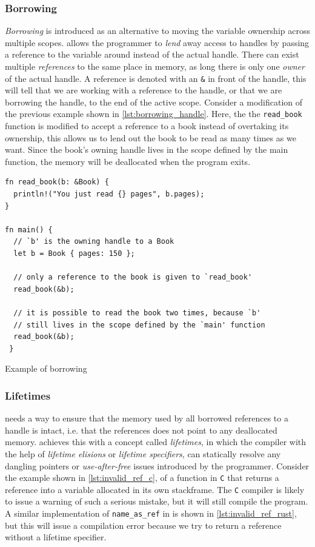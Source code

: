 \subsubsection{Borrowing}
\label{ssec:borrowing}

\emph{Borrowing} is introduced as an alternative to moving the variable ownership across multiple scopes.
\rust allows the programmer to \emph{lend} away access to handles by passing a reference to the variable around instead of the actual handle.
There can exist multiple \emph{references} to the same place in memory, as long there is only one \emph{owner} of the actual handle.
A reference is denoted with an \texttt{\&} in front of the handle, this will tell \rust that we are working with a reference to the handle, or that we are borrowing the handle, to the end of the active scope.
Consider a modification of the previous example shown in \autoref{lst:borrowing_handle}.
Here, the the \texttt{read\_book} function is modified to accept a reference to a book instead of overtaking its ownership, this allows us to lend out the book to be read as many times as we want.
Since the book's owning handle lives in the scope defined by the main function, the memory will be deallocated when the program exits.

\begin{listing}[tb]
\begin{verbatim}
fn read_book(b: &Book) {
  println!("You just read {} pages", b.pages);
}

fn main() {
  // `b' is the owning handle to a Book
  let b = Book { pages: 150 };

  // only a reference to the book is given to `read_book'
  read_book(&b);

  // it is possible to read the book two times, because `b'
  // still lives in the scope defined by the `main' function
  read_book(&b);
 }
\end{verbatim}
\caption{Example of borrowing}
\label{lst:borrowing_handle}
\end{listing}

\subsubsection{Lifetimes}
\label{ssec:lifetimes}

\rust needs a way to ensure that the memory used by all borrowed references to a handle is intact, i.e. that the references does not point to any deallocated memory.
\rust achieves this with a concept called \emph{lifetimes}, in which the compiler with the help of \emph{lifetime elisions} or \emph{lifetime specifiers}, can statically resolve any dangling pointers or \emph{use-after-free} issues introduced by the programmer.
Consider the example shown in \autoref{lst:invalid_ref_c}, of a function in \texttt{C} that returns a reference into a variable allocated in its own stackframe.
The \texttt{C} compiler is likely to issue a warning of such a serious mistake, but it will still compile the program.
A similar implementation of \texttt{name\_as\_ref} in \rust is shown in \autoref{lst:invalid_ref_rust}, but this will issue a compilation error because we try to return a reference without a lifetime specifier.

